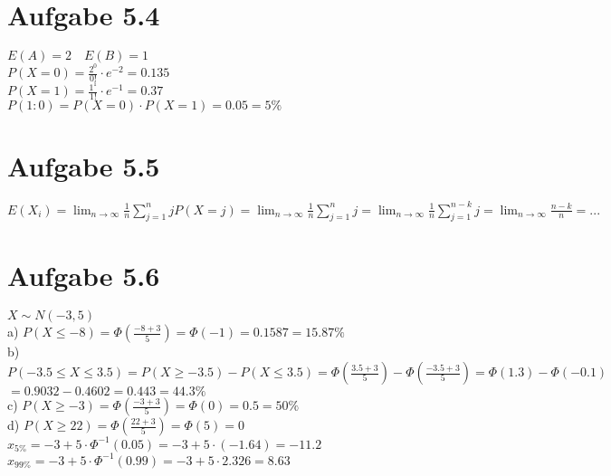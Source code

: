 \documentclass{article}
\begin{document}
	\section*{Aufgabe 5.4}
		$E(A) = 2 \quad E(B) = 1$ \\
		\newline
		$P(X=0)=\frac{2^0}{0!}\cdot e^{-2} = 0.135$ \\
		\newline
		$P(X=1)=\frac{1^1}{1!}\cdot e^{-1} = 0.37$ \\
		\newline
		$P(1:0) = P(X=0) \cdot P(X=1) = 0.05 = 5\% $
	
	\section*{Aufgabe 5.5}
		$E(X_{i}) = \lim_{n\to\infty}\frac{1}{n}\sum_{j=1}^{n}jP(X=j) = \lim_{n\to\infty}\frac{1}{n}\sum_{j=1}^{n}j = \lim_{n\to\infty}\frac{1}{n}\sum_{j=1}^{n-k}j = \lim_{n\to\infty}\frac{n-k}{n} = ... $
	\pagebreak
		
	\section*{Aufgabe 5.6}
		$X \sim N(-3, 5)$ \\
		\newline
		a) $P(X \leq -8)=\Phi(\frac{-8 + 3}{5}) = \Phi(-1)=0.1587 = 15.87\%$ \\
		\newline
		b) $P(-3.5 \leq X \leq 3.5) = P(X \geq -3.5) - P(X \leq 3.5) =  \Phi(\frac{3.5 + 3}{5}) - \Phi(\frac{-3.5 + 3}{5}) = \Phi(1.3) - \Phi(-0.1)$ \\
		\newline
		$= 0.9032 - 0.4602 = 0.443 = 44.3\%$ \\
		\newline
		c) $P(X \geq -3) = \Phi(\frac{-3 + 3}{5}) = \Phi(0) = 0.5 = 50\%$ \\
		\newline
		d) $P(X \geq 22) = \Phi(\frac{22 + 3}{5}) = \Phi(5) = 0$ \\
		\newline
		$x_{5\%} = -3 + 5 \cdot \Phi^{-1}(0.05) = -3 + 5 \cdot (-1.64) = -11.2$  \\
		\newline
		$x_{99\%} = -3 + 5 \cdot \Phi^{-1}(0.99) = -3 + 5 \cdot 2.326 = 8.63$ 
		
\end{document}
